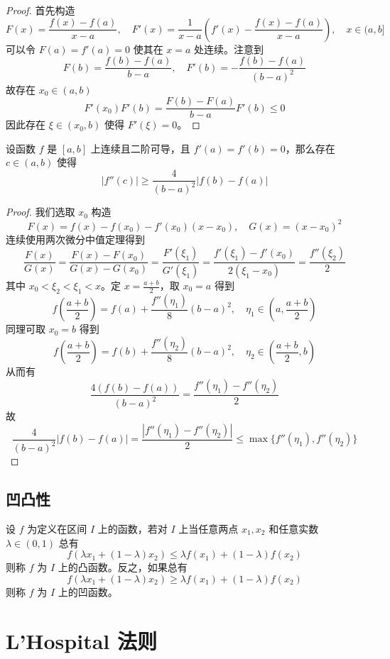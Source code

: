 \begin{proof}
	首先构造
	\[ F(x) = \frac{f(x) - f(a)}{x - a}, \quad F'(x) = \frac{1}{x-a} \left(f'(x) - \frac{f(x) - f(a)}{x-a}\right), \quad x \in (a, b] \]
	可以令 $F(a) = f'(a) = 0$ 使其在 $x=a$ 处连续。注意到
	\[ F(b) = \frac{f(b) - f(a)}{b-a}, \quad F'(b) = -\frac{f(b) - f(a)}{(b-a)^2} \]
	故存在 $x_0 \in (a, b)$
	\[ F'(x_0) F'(b) = \frac{F(b) - F(a)}{b - a} F'(b) \leqslant 0 \]
	因此存在 $\xi \in (x_0, b)$ 使得 $F'(\xi) = 0$。
\end{proof}

\begin{proposition}
	设函数 $f$ 是 $[a,b]$ 上连续且二阶可导，且 $f'(a) = f'(b) = 0$，那么存在 $c \in (a,b)$ 使得
	\[ |f''(c)| \geqslant \frac{4}{(b-a)^2} |f(b) - f(a)| \]
\end{proposition}

\begin{proof}
	我们选取 $x_0$ 构造
	\[ F(x) = f(x) - f(x_0) - f'(x_0)(x-x_0) , \quad G(x) = (x-x_0)^2 \]
	连续使用两次微分中值定理得到
	\[ \frac{F(x)}{G(x)} = \frac{F(x) - F(x_0)}{G(x) - G(x_0)} = \frac{F'(\xi_1)}{G'(\xi_1)} = \frac{f'(\xi_1) - f'(x_0)}{2 (\xi_1 - x_0)} = \frac{f''(\xi_2)}{2} \]
	其中 $x_0 < \xi_2 < \xi_1 < x$。定 $x=\frac{a+b}{2}$，取 $x_0 = a$ 得到
	\[ f\left(\frac{a+b}{2}\right) = f(a) + \frac{f''(\eta_1)}{8} (b-a)^2, \quad \eta_1 \in \left(a, \frac{a+b}{2}\right) \]
	同理可取 $x_0 = b$ 得到
	\[ f\left(\frac{a+b}{2}\right) = f(b) + \frac{f''(\eta_2)}{8} (b-a)^2, \quad \eta_2 \in \left(\frac{a+b}{2}, b\right) \]
	从而有
	\[ \frac{4(f(b) - f(a))}{(b-a)^2} = \frac{f''(\eta_1) - f''(\eta_2)}{2} \]
	故
	\[ \frac{4}{(b-a)^2}|f(b) - f(a)| = \frac{|f''(\eta_1) - f''(\eta_2)|}{2} \leqslant \max\{f''(\eta_1), f''(\eta_2)\} \]
\end{proof}

\subsection{凹凸性}

\begin{definition}
	设 $f$ 为定义在区间 $I$ 上的函数，若对 $I$ 上当任意两点 $x_1,x_2$ 和任意实数 $\lambda\in (0,1)$ 总有
	\[ f(\lambda x_1+(1-\lambda)x_2) \leqslant \lambda f(x_1)+(1-\lambda)f(x_2) \]
	则称 $f$ 为 $I$ 上的凸函数。反之，如果总有
	\[ f(\lambda x_1+(1-\lambda)x_2) \geqslant \lambda f(x_1)+(1-\lambda)f(x_2) \]
	则称 $f$ 为 $I$ 上的凹函数。
\end{definition}

\section{L'Hospital 法则}

